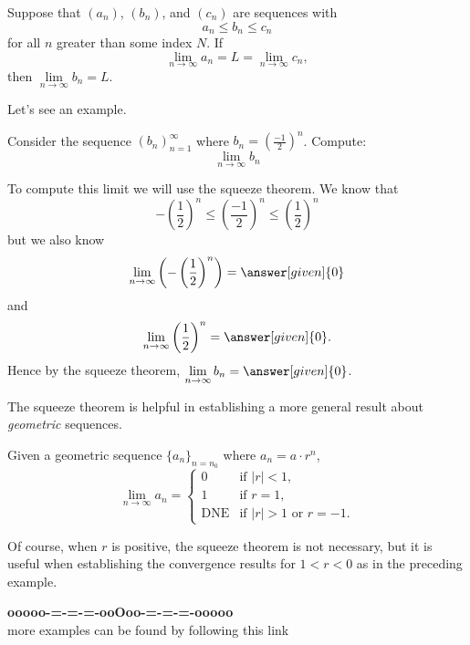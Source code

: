 \documentclass{ximera}
\begin{document}
\begin{theorem}
  Suppose that $(a_n)$, $(b_n)$, and $(c_n)$ are sequences with
  \[
  a_n \le b_n \le c_n
  \]
  for all $n$ greater than some index $N$. If
  \[
  \lim\limits_{n\to\infty} a_n = L = \lim\limits_{n\to\infty} c_n,
  \] 
  then $\lim\limits_{n\to\infty} b_n = L$.
\end{theorem}

Let's see an example.

\begin{example}
  Consider the sequence $(b_n)_{n=1}^{\infty}$ where $b_n =
  \left(\frac{-1}{2}\right)^n$. Compute:
  \[
  \lim\limits_{n\to\infty}b_n
  \]
  \begin{explanation}
    To compute this limit we will use the squeeze theorem. We know that
    \[
    -\left(\frac{1}{2}\right)^n\le \left(\frac{-1}{2}\right)^n \le \left(\frac{1}{2}\right)^n
    \]
    but we also know
    \[
    \lim\limits_{n\to \infty}\left(-\left(\frac{1}{2}\right)^n\right) = \answer[given]{0}
    \]
    and
    \[
    \lim\limits_{n\to \infty}\left(\frac{1}{2}\right)^n =\answer[given]{0}.
    \]
    Hence by the squeeze theorem, $\lim\limits_{n\to\infty} b_n = \answer[given]{0}$.
  \end{explanation}
\end{example}

%

The squeeze theorem is helpful in establishing a more general result about \emph{geometric} sequences.
\begin{theorem}
  Given a geometric sequence $\{a_n\}_{n=n_0}$ where $a_n = a \cdot r^{n}$,
  \[
  \lim\limits_{n\to\infty} a_n =
  \begin{cases}
    0 &\text{if $|r|<1$,}\\
    1 &\text{if $r=1$,}\\
    \text{DNE} &\text{if $|r|>1$ or $r=-1$.}
  \end{cases}
  \]
\end{theorem}
Of course, when $r$ is positive, the squeeze theorem is not necessary, but it is useful when establishing the convergence results for $1<r<0$ as in the preceding example.

















\begin{center}
\textbf{\textcolor{green!50!black}{ooooo-=-=-=-ooOoo-=-=-=-ooooo}} \\

more examples can be found by following this link\\ 

\end{center}
\end{document}
